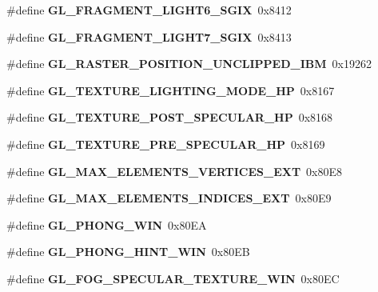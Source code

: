 \begin{DoxyCompactItemize}
\item 
\#define {\bfseries G\+L\+\_\+\+F\+R\+A\+G\+M\+E\+N\+T\+\_\+\+L\+I\+G\+H\+T6\+\_\+\+S\+G\+I\+X}~0x8412\label{_s_d_l__opengl_8h_a06ff5e173bdd0391698a0cc90226e320}

\item 
\#define {\bfseries G\+L\+\_\+\+F\+R\+A\+G\+M\+E\+N\+T\+\_\+\+L\+I\+G\+H\+T7\+\_\+\+S\+G\+I\+X}~0x8413\label{_s_d_l__opengl_8h_aebb021d844fa62aceaba74736f9c09de}

\item 
\#define {\bfseries G\+L\+\_\+\+R\+A\+S\+T\+E\+R\+\_\+\+P\+O\+S\+I\+T\+I\+O\+N\+\_\+\+U\+N\+C\+L\+I\+P\+P\+E\+D\+\_\+\+I\+B\+M}~0x19262\label{_s_d_l__opengl_8h_adc57bf3d52b6aa51c993dd434b5cd0ef}

\item 
\#define {\bfseries G\+L\+\_\+\+T\+E\+X\+T\+U\+R\+E\+\_\+\+L\+I\+G\+H\+T\+I\+N\+G\+\_\+\+M\+O\+D\+E\+\_\+\+H\+P}~0x8167\label{_s_d_l__opengl_8h_a4fcae5d12b587867b0aed9a5262b0ea4}

\item 
\#define {\bfseries G\+L\+\_\+\+T\+E\+X\+T\+U\+R\+E\+\_\+\+P\+O\+S\+T\+\_\+\+S\+P\+E\+C\+U\+L\+A\+R\+\_\+\+H\+P}~0x8168\label{_s_d_l__opengl_8h_a1721d1a906e60610b1fe070881bf8858}

\item 
\#define {\bfseries G\+L\+\_\+\+T\+E\+X\+T\+U\+R\+E\+\_\+\+P\+R\+E\+\_\+\+S\+P\+E\+C\+U\+L\+A\+R\+\_\+\+H\+P}~0x8169\label{_s_d_l__opengl_8h_ab66441c341131a8e274cb22547825eed}

\item 
\#define {\bfseries G\+L\+\_\+\+M\+A\+X\+\_\+\+E\+L\+E\+M\+E\+N\+T\+S\+\_\+\+V\+E\+R\+T\+I\+C\+E\+S\+\_\+\+E\+X\+T}~0x80\+E8\label{_s_d_l__opengl_8h_ab9cf7464e72d5a7ad2553e50a251bedf}

\item 
\#define {\bfseries G\+L\+\_\+\+M\+A\+X\+\_\+\+E\+L\+E\+M\+E\+N\+T\+S\+\_\+\+I\+N\+D\+I\+C\+E\+S\+\_\+\+E\+X\+T}~0x80\+E9\label{_s_d_l__opengl_8h_a1ee1747aec733cb655d389172ac134f4}

\item 
\#define {\bfseries G\+L\+\_\+\+P\+H\+O\+N\+G\+\_\+\+W\+I\+N}~0x80\+E\+A\label{_s_d_l__opengl_8h_a082750ee8782dd8d7a0059731f4aa4ec}

\item 
\#define {\bfseries G\+L\+\_\+\+P\+H\+O\+N\+G\+\_\+\+H\+I\+N\+T\+\_\+\+W\+I\+N}~0x80\+E\+B\label{_s_d_l__opengl_8h_a266651c0aabb70ec79c89900f98a7b15}

\item 
\#define {\bfseries G\+L\+\_\+\+F\+O\+G\+\_\+\+S\+P\+E\+C\+U\+L\+A\+R\+\_\+\+T\+E\+X\+T\+U\+R\+E\+\_\+\+W\+I\+N}~0x80\+E\+C\label{_s_d_l__opengl_8h_a784412d4a0340e0b215809aaded4ed92}


\end{DoxyCompactItemize}
